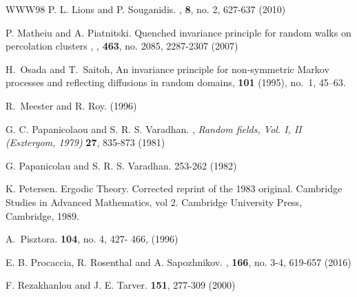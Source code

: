 \documentclass[11pt]{article}
\theoremstyle{rem}
\begin{document}
\begin{thebibliography}{WWW98}
 {\sc P. L. Lions} and {\sc P. Souganidis}.
  , {\bf 8}, no. 2, 627-637 (2010)


 {\sc P. Matheiu} and {\sc A. Piatnitski}. \newblock
  Quenched invariance principle for random walks on percolation clusters ,
  , {\bf 463}, no. 2085, 2287-2307 (2007)

H.~Osada and T.~Saitoh,
\newblock An invariance principle for non-symmetric Markov processes and reflecting diffusions in random domains,
 \textbf{101} (1995), no.~1, 45--63.


 {\sc R.~Meester} and {\sc R. Roy.}    (1996)

 {\sc G. C. Papanicolaou} and {\sc S. R. S. Varadhan}.
  , {\it Random fields, Vol. I, II (Esztergom, 1979)} {\bf 27}, 835-873 
  (1981)

 {\sc G. Papanicolau} and {\sc S. R. S. Varadhan.}
      253-262 (1982)


 {\sc K. Petersen}. \newblock Ergodic Theory.  \newblock
  Corrected reprint of the 1983 original. Cambridge Studies in Advanced
  Mathematics, vol 2. Cambridge University Press, Cambridge, 1989.

 {\sc A.~Pisztora.}   {\bf 104}, no. 4, 427- 466, (1996)


 {\sc E. B. Procaccia}, {\sc R. Rosenthal} and {\sc
    A. Sapozhnikov}. ,
   {\bf 166}, no. 3-4, 619-657 (2016)
  
  
  {\sc F. Rezakhanlou} and {\sc J. E. Tarver.}
   {\bf 151}, 277-309 (2000)  
  


\end{thebibliography}
\end{document}

